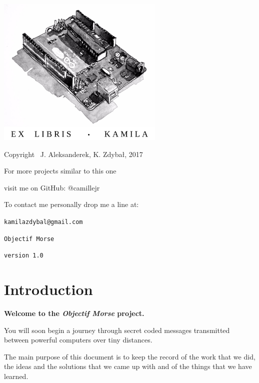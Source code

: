 \documentclass[12pt]{report}
\begin{document}
\thispagestyle{empty}
\begin{center}
    
\vspace*{4cm}

\includegraphics[width = 80mm]{arduino_dwg.jpg}

\vspace*{2cm}

Copyright \textcopyright \, J. Aleksanderek, K. Zdybał, 2017

For more projects similar to this one

visit me on GitHub: @camillejr

To contact me personally drop me a line at:

\verb|kamilazdybal@gmail.com|


\vspace*{2cm}

\verb|Objectif Morse|

\verb|version 1.0|
\end{center}
\newpage




\setlength{\parindent}{0cm}
\clearpage

\tableofcontents

\setlength{\parskip}{1em}
\renewcommand{\baselinestretch}{1.0}

\chapter{Introduction}\label{chap:intro}

\textbf{Welcome to the \textit{Objectif Morse} project.}

You will soon begin a journey through secret coded messages transmitted between powerful computers over tiny distances.

The main purpose of this document is to keep the record of the work that we did, the ideas and the solutions that we came up with and of the things that we have learned.
\end{document}
